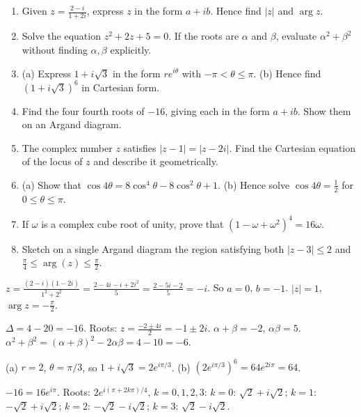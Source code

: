 \documentclass[11pt]{article}
\begin{document}
\begin{exercice}
\begin{enumerate}
\item Given $z = \frac{2-i}{1+2i}$, express $z$ in the form $a+ib$. Hence find $|z|$ and $\arg z$.
\item Solve the equation $z^2 + 2z + 5 = 0$. If the roots are $\alpha$ and $\beta$, evaluate $\alpha^2 + \beta^2$ without finding $\alpha,\beta$ explicitly.
\item (a) Express $1+i\sqrt{3}$ in the form $re^{i\theta}$ with $-\pi<\theta\le\pi$.
(b) Hence find $(1+i\sqrt{3})^6$ in Cartesian form.
\item Find the four fourth roots of $-16$, giving each in the form $a+ib$. Show them on an Argand diagram.
\item The complex number $z$ satisfies $|z-1| = |z-2i|$. Find the Cartesian equation of the locus of $z$ and describe it geometrically.
\item (a) Show that $\cos 4\theta = 8\cos^4\theta - 8\cos^2\theta + 1$.
(b) Hence solve $\cos 4\theta = \frac{1}{2}$ for $0 \le \theta \le \pi$.
\item If $\omega$ is a complex cube root of unity, prove that $(1-\omega+\omega^2)^4 = 16\omega$.
\item Sketch on a single Argand diagram the region satisfying both $|z-3| \le 2$ and $\frac{\pi}{4} \le \arg(z) \le \frac{\pi}{2}$.
\end{enumerate}
\end{exercice}

\begin{corrige}[Exercise 1]
$z = \frac{(2-i)(1-2i)}{1^2+2^2} = \frac{2-4i-i+2i^2}{5} = \frac{2-5i-2}{5} = -i$. So $a=0$, $b=-1$. $|z|=1$, $\arg z = -\frac{\pi}{2}$.
\end{corrige}

\begin{corrige}[Exercise 2]
$\Delta = 4 - 20 = -16$. Roots: $z = \frac{-2\pm 4i}{2} = -1\pm 2i$.
$\alpha+\beta = -2$, $\alpha\beta = 5$. $\alpha^2+\beta^2 = (\alpha+\beta)^2 - 2\alpha\beta = 4 - 10 = -6$.
\end{corrige}

\begin{corrige}[Exercise 3]
(a) $r=2$, $\theta=\pi/3$, so $1+i\sqrt{3} = 2e^{i\pi/3}$.
(b) $(2e^{i\pi/3})^6 = 64 e^{2i\pi} = 64$.
\end{corrige}

\begin{corrige}[Exercise 4]
$-16 = 16e^{i\pi}$. Roots: $2e^{i(\pi+2k\pi)/4}$, $k=0,1,2,3$:
$k=0$: $\sqrt{2}+i\sqrt{2}$; $k=1$: $-\sqrt{2}+i\sqrt{2}$; $k=2$: $-\sqrt{2}-i\sqrt{2}$; $k=3$: $\sqrt{2}-i\sqrt{2}$.
\end{corrige}
\end{document}
